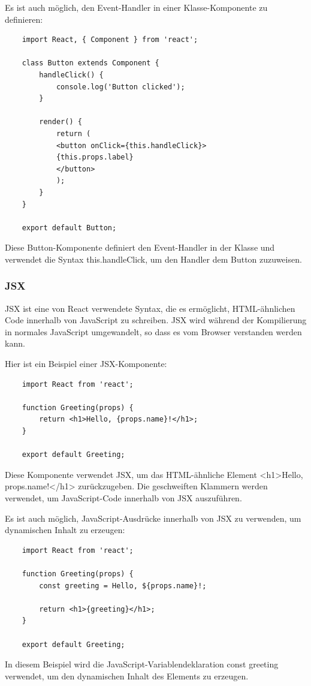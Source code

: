 Es ist auch möglich, den Event-Handler in einer Klasse-Komponente zu definieren:

\begin{verbatim}
	import React, { Component } from 'react';
	
	class Button extends Component {
		handleClick() {
			console.log('Button clicked');
		}
		
		render() {
			return (
			<button onClick={this.handleClick}>
			{this.props.label}
			</button>
			);
		}
	}
	
	export default Button;
\end{verbatim}

Diese Button-Komponente definiert den Event-Handler in der Klasse und verwendet die Syntax this.handleClick, um den Handler dem Button zuzuweisen.
\subsubsection{JSX}
JSX ist eine von React verwendete Syntax, die es ermöglicht, HTML-ähnlichen Code innerhalb von JavaScript zu schreiben. JSX wird während der Kompilierung in normales JavaScript umgewandelt, so dass es vom Browser verstanden werden kann.

Hier ist ein Beispiel einer JSX-Komponente:

\begin{verbatim}
	import React from 'react';
	
	function Greeting(props) {
		return <h1>Hello, {props.name}!</h1>;
	}
	
	export default Greeting;
\end{verbatim}

Diese Komponente verwendet JSX, um das HTML-ähnliche Element <h1>Hello, {props.name}!</h1> zurückzugeben. Die geschweiften Klammern {} werden verwendet, um JavaScript-Code innerhalb von JSX auszuführen.

Es ist auch möglich, JavaScript-Ausdrücke innerhalb von JSX zu verwenden, um dynamischen Inhalt zu erzeugen:

\begin{verbatim}
	import React from 'react';
	
	function Greeting(props) {
		const greeting = Hello, ${props.name}!;
		
		return <h1>{greeting}</h1>;
	}
	
	export default Greeting;
\end{verbatim}

In diesem Beispiel wird die JavaScript-Variablendeklaration const greeting verwendet, um den dynamischen Inhalt des Elements zu erzeugen.

